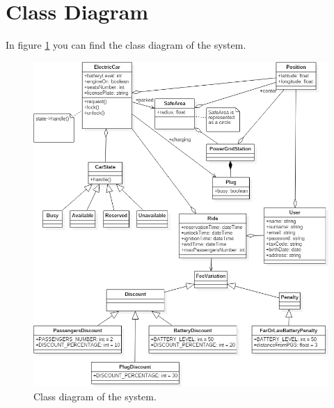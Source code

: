 \section{Class Diagram}
In figure \ref{fig:class_diagram} you can find the class diagram of the system.

\begin{figure}
	\centering
	\includegraphics[width=\textwidth,height=\dimexpr\textheight-4\baselineskip-\abovecaptionskip-\belowcaptionskip\relax,keepaspectratio]{models/class_diagram.png}
	\caption{Class diagram of the system.}
	\label{fig:class_diagram}
\end{figure}